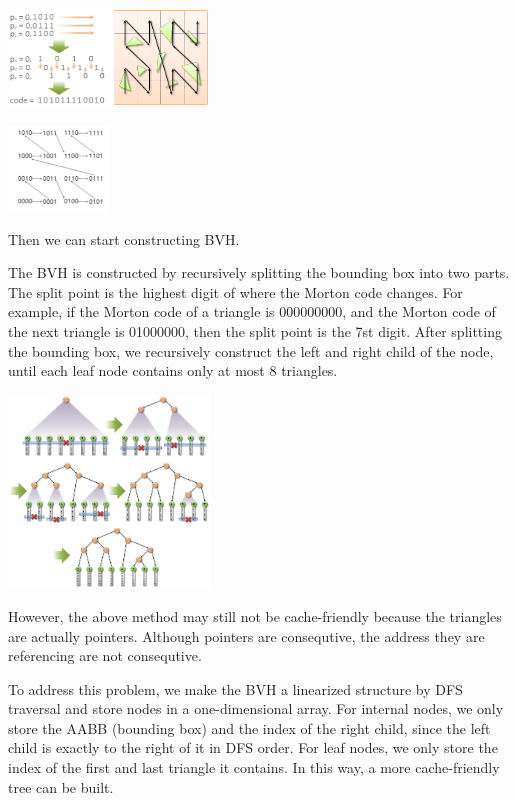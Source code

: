 \documentclass[acmtog]{acmart}
\begin{document}
\begin{itemize}
\begin{center}
	\includegraphics[width=0.4\textwidth]{pictures/morton-code-and-z-curve.png}

	\includegraphics[width=0.2\textwidth]{pictures/morton-z.jpg}
\end{center}

Then we can start constructing BVH.

The BVH is constructed by recursively splitting the bounding box into two parts. 
The split point is the highest digit of where the Morton code changes.
For example, if the Morton code of a triangle is 000000000, and the Morton code of the next triangle is 01000000, then the split point is the 7st digit.
After splitting the bounding box, we recursively construct the left and right child of the node, until each leaf node contains only at most 8 triangles.

\begin{center}
	\includegraphics[width=0.4\textwidth]{pictures/top-down-generation.png}
\end{center}

However, the above method may still not be cache-friendly because the triangles are actually pointers. Although pointers are consequtive, the address they are referencing are not consequtive. 

To address this problem, we make the BVH a linearized structure by DFS traversal and store nodes in a one-dimensional array. For internal nodes, we only store the AABB (bounding box) and the index of the right child, since the left child is exactly to the right of it in DFS order. For leaf nodes, we only store the index of the first and last triangle it contains. In this way, a more cache-friendly tree can be built.



\end{itemize}
\end{document}
